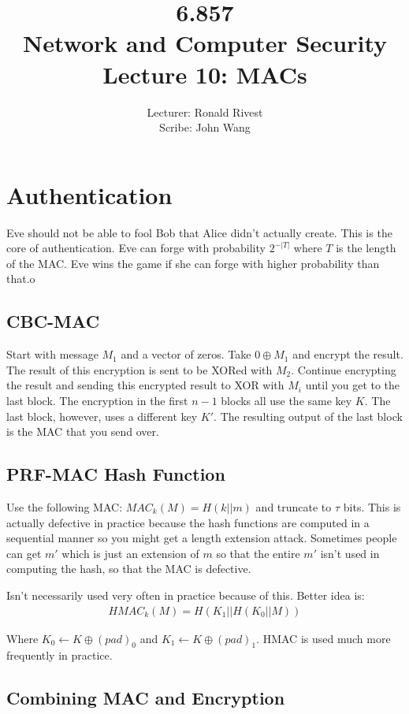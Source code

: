 \documentclass[psamsfonts]{amsart}
\title{6.857 \\
Network and Computer Security \\
Lecture 10: MACs}
\author{Lecturer: Ronald Rivest\\
Scribe: John Wang}
\begin{document}
\maketitle

\section{Authentication}

Eve should not be able to fool Bob that Alice didn't actually create. This is the core of authentication. Eve can forge with probability $2^{-|T|}$ where $T$ is the length of the MAC. Eve wins the game if she can forge with higher probability than that.o

\subsection{CBC-MAC}

Start with message $M_1$ and a vector of zeros. Take $0 \oplus M_1$ and encrypt the result. The result of this encryption is sent to be XORed with $M_2$. Continue encrypting the result and sending this encrypted result to XOR with $M_i$ until you get to the last block. The encryption in the first $n-1$ blocks all use the same key $K$. The last block, however, uses a different key $K'$. The resulting output of the last block is the MAC that you send over.

\subsection{PRF-MAC Hash Function}

Use the following MAC: $MAC_{k}(M) = H(k || m)$ and truncate to $\tau$ bits. This is actually defective in practice because the hash functions are computed in a sequential manner so you might get a length extension attack. Sometimes people can get $m'$ which is just an extension of $m$ so that the entire $m'$ isn't used in computing the hash, so that the MAC is defective.

Isn't necessarily used very often in practice because of this. Better idea is:
\begin{eqnarray}
  HMAC_{k}(M) = H(K_1 || H(K_0 || M))
\end{eqnarray}

Where $K_0 \leftarrow K \oplus (pad)_0$ and $K_1 \leftarrow K \oplus (pad)_1$. HMAC is used much more frequently in practice.

\subsection{Combining MAC and Encryption}
\end{document}
